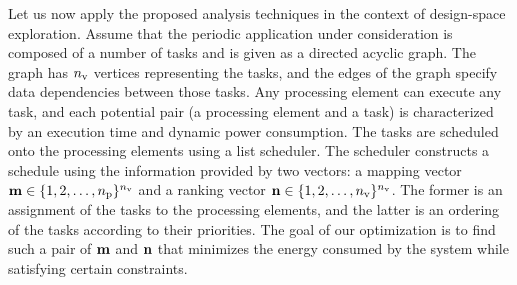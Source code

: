 Let us now apply the proposed analysis techniques in the context of design-space exploration.
Assume that the periodic application under consideration is composed of a number of tasks and is given as a directed acyclic graph.
The graph has ${n_\text{v}}$ vertices representing the tasks, and the edges of the graph specify data dependencies between those tasks.
Any processing element can execute any task, and each potential pair (a processing element and a task) is characterized by an execution time and dynamic power consumption.
The tasks are scheduled onto the processing elements using a list scheduler.
The scheduler constructs a schedule using the information provided by two vectors: a mapping vector $\mathbf{m} \in \{ 1, 2, \dotsc, {n_\text{p}} \}^{n_\text{v}}$ and a ranking vector $\mathbf{n} \in \{ 1, 2, \dotsc, {n_\text{v}} \}^{n_\text{v}}$.
The former is an assignment of the tasks to the processing elements, and the latter is an ordering of the tasks according to their priorities.
The goal of our optimization is to find such a pair of $\mathbf{m}$ and $\mathbf{n}$ that minimizes the energy consumed by the system while satisfying certain constraints.

